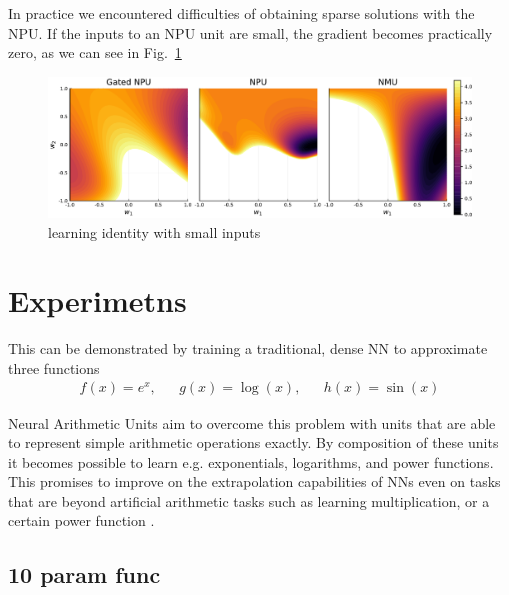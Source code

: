\documentclass[9pt]{article}
\begin{document}
In practice we encountered difficulties of obtaining sparse solutions with the
NPU. If the inputs to an NPU unit are small, the gradient becomes practically
zero, as we can see in Fig.~\ref{fig:id_loss_npu_nmu}
\begin{figure}
  \centering
  \includegraphics[width=0.8\linewidth]{id_loss_npu_nmu.pdf}
  \caption{learning identity with small inputs}%
  \label{fig:id_loss_npu_nmu}
\end{figure}

\section{Experimetns}%
\label{sec:experimetns}
This can be demonstrated by training a traditional, dense NN to approximate
three functions
\begin{align}
  \label{eq:approx_tasks}
  f(x) = e^x, && g(x) = \log(x), && h(x) = \sin(x)
\end{align}

Neural Arithmetic Units aim to overcome this problem with units that are able
to represent simple arithmetic operations exactly. By composition of these
units it becomes possible to learn e.g. exponentials, logarithms, and power
functions. This promises to improve on the extrapolation capabilities of NNs
even on tasks that are beyond artificial arithmetic tasks such as learning
multiplication, or a certain power function .


\subsection{10 param func}%
\label{sub:10_param_func}
\end{document}

